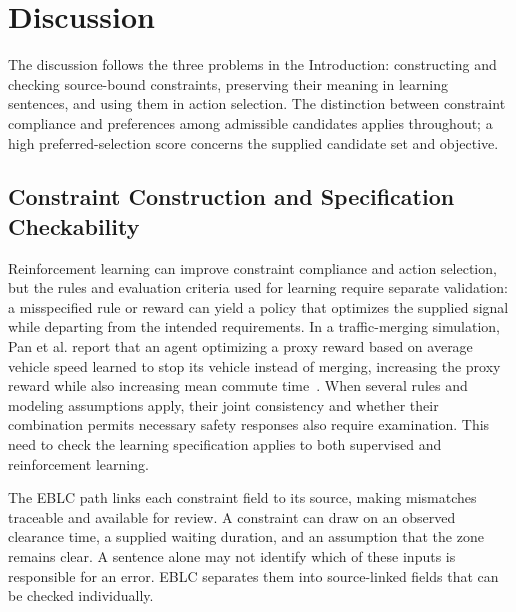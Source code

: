 \section{Discussion}\label{sec:discussion}

The discussion follows the three problems in the Introduction: constructing
and checking source-bound constraints, preserving their meaning in learning
sentences, and using them in action selection. The distinction between
constraint compliance and preferences among admissible candidates applies
throughout; a high preferred-selection score concerns the supplied candidate
set and objective.

\subsection{Constraint Construction and Specification Checkability}\label{sec:discussion-checkability}

Reinforcement learning can improve constraint compliance and action selection, but
the rules and evaluation criteria used for learning require separate validation:
a misspecified rule or reward can yield a policy that optimizes the supplied
signal while departing from the intended requirements. In a traffic-merging
simulation, Pan et al. report that an agent optimizing a proxy reward based on
average vehicle speed learned to stop its vehicle instead of merging, increasing
the proxy reward while also increasing mean commute time~\cite{Pan2022RewardMisspecification}.
When several rules and modeling assumptions apply, their joint consistency and
whether their combination permits necessary safety responses also require
examination. This need to check the learning specification applies to both
supervised and reinforcement learning.

The EBLC path links each constraint field to its source, making mismatches
traceable and available for review. A constraint can draw on an observed
clearance time, a supplied waiting duration, and an assumption that the zone
remains clear. A sentence alone may not identify which of these inputs is
responsible for an error. EBLC separates them into source-linked fields that
can be checked individually.

